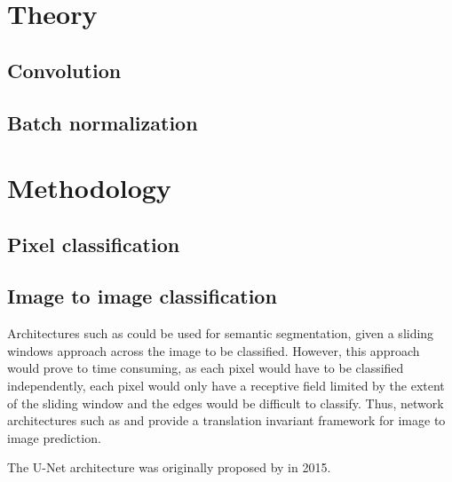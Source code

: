 \documentclass[../main/thesis.tex]{subfiles}
\begin{document}
\section{Theory}
\subsection{Convolution}


\subsection{Batch normalization}



\section{Methodology}



\subsection{Pixel classification}



\subsection{Image to image classification}
Architectures such as \cite{Krizhevsky2012} could be used for semantic segmentation, given a sliding windows approach across the image to be classified. However, this approach would prove to time consuming, as each pixel would have to be classified independently, each pixel would only have a receptive field limited by the extent of the sliding window and the edges would be difficult to classify. Thus, network architectures such as \cite{Long2014} and \cite{Ronneberger2015} provide a translation invariant framework for image to image prediction. 

The U-Net architecture was originally proposed by \cite{Ronneberger2015} in 2015. 

\biblio
\end{document}
